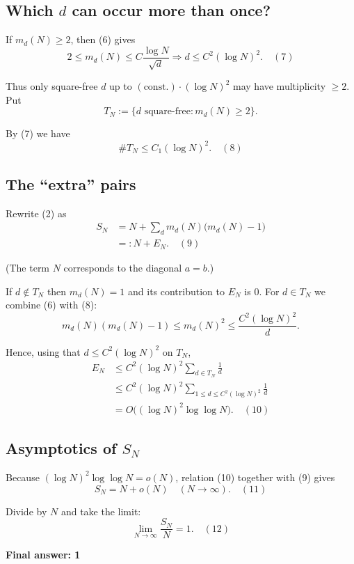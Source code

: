 \documentclass[12pt,a4paper]{article}
\theoremstyle{definition}
\begin{document}
        \subsection*{Which $d$ can occur more than once?}
        If $m_d(N) \geq 2$, then (6) gives
        \[2 \leq m_d(N) \leq C\frac{\log N}{\sqrt{d}} \Longrightarrow d \leq C^2(\log N)^2. \quad (7)\]

        Thus only square-free $d$ up to $(\text{const.}) \cdot (\log N)^2$ may have multiplicity $\geq 2$. Put
        \[T_N := \{d \text{ square-free}: m_d(N) \geq 2\}.\]

        By (7) we have
        \[\#T_N \leq C_1(\log N)^2. \quad (8)\]

        \subsection*{The ``extra'' pairs}
        Rewrite (2) as
        \begin{align}
            S_N &= N + \sum_d m_d(N)\bigl(m_d(N) - 1\bigr) \\
            &=: N + E_N. \quad (9)
        \end{align}

        (The term $N$ corresponds to the diagonal $a = b$.)

        If $d \notin T_N$ then $m_d(N) = 1$ and its contribution to $E_N$ is 0. For $d \in T_N$ we combine (6) with (8):
        \[m_d(N)(m_d(N) - 1) \leq m_d(N)^2 \leq \frac{C^2(\log N)^2}{d}.\]

        Hence, using that $d \leq C^2(\log N)^2$ on $T_N$,
        \begin{align}
            E_N &\leq C^2(\log N)^2 \sum_{d \in T_N} \frac{1}{d} \\
            &\leq C^2(\log N)^2 \sum_{1 \leq d \leq C^2(\log N)^2} \frac{1}{d} \\
            &= O\bigl((\log N)^2 \log \log N\bigr). \quad (10)
        \end{align}

        \subsection*{Asymptotics of $S_N$}
        Because $(\log N)^2 \log \log N = o(N)$, relation (10) together with (9) gives
        \[S_N = N + o(N) \quad (N \to \infty). \quad (11)\]

        Divide by $N$ and take the limit:
        \[\lim_{N \to \infty} \frac{S_N}{N} = 1. \quad (12)\]

        \textbf{Final answer: 1}
\end{document}
